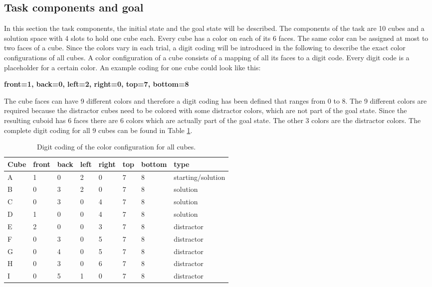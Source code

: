 \newpage

\subsection{Task components and goal} \label{sec:task_components}
In this section the task components, the initial state and the goal state will be described.
The components of the task are 10 cubes and a solution space with 4 slots to hold one cube each. Every cube has a color on each of its 6 faces. The same color can be assigned at most to two faces of a cube. Since the colors vary in each trial, a digit coding will be introduced in the following to describe the exact color configurations of all cubes. A color configuration of a cube consists of a mapping of all its faces to a digit code. Every digit code is a placeholder for a certain color. An example coding for one cube could look like this: 

\begin{center}
\textbf{front=1, back=0, left=2, right=0, top=7, bottom=8}
\end{center}


The cube faces can have 9 different colors and therefore a digit coding has been defined that ranges from 0 to 8. The 9 different colors are required because the distractor cubes need to be colored with some distractor colors, which are not part of the goal state. Since the resulting cuboid has 6 faces there are 6 colors which are actually part of the goal state. The other 3 colors are the distractor colors. The complete digit coding for all 9 cubes can be found in Table \ref{tab:digit_coding}.

\begin{table}
\begin{center}
    \begin{tabular}{| l | | l | l | l | l | l | l |  l |}
    \hline
    \textbf{Cube} & \textbf{front} & \textbf{back} & \textbf{left} & \textbf{right} & \textbf{top} & \textbf{bottom} & \textbf{type} \\ \hline
    A & 1 & 0 & 2 & 0 & 7 & 8 & starting/solution \\ \hline
    B & 0 & 3 & 2 & 0 & 7 & 8 & solution \\ \hline
    C & 0 & 3 & 0 & 4 & 7 & 8 & solution \\ \hline
    D & 1 & 0 & 0 & 4 & 7 & 8 & solution \\ \hline
    E & 2 & 0 & 0 & 3 & 7 & 8 & distractor \\ \hline
    F & 0 & 3 & 0 & 5 & 7 & 8 & distractor \\ \hline
    G & 0 & 4 & 0 & 5 & 7 & 8 & distractor \\ \hline
    H & 0 & 3 & 0 & 6 & 7 & 8 & distractor \\ \hline
    I & 0 & 5 & 1 & 0 & 7 & 8 & distractor \\ \hline
    \end{tabular}
\end{center}
\caption{Digit coding of the color configuration for all cubes.}
\label{tab:digit_coding}
\end{table}

